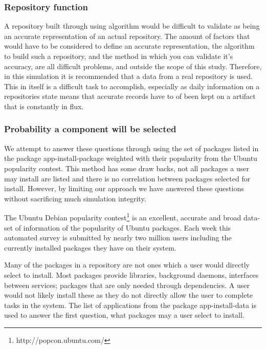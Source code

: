 \subsubsection{Repository function}

A repository built through using algorithm would be difficult to validate as being an accurate representation of an actual repository.
The amount of factors that would have to be considered to define an accurate representation, the algorithm to build such a repository,
and the method in which you can validate it's accuracy,
are all difficult problems, and outside the scope of this study. 
Therefore, in this simulation it is recommended that a data from a real repository is used.
This in itself is a difficult task to accomplish, especially as daily information on a repositories state means that accurate records have to of been kept on a artifact that is constantly in flux.

\subsubsection{Probability a component will be selected}
{}We attempt to answer these questions through using the set of packages listed in the package app-install-package
{}weighted with their popularity from the Ubuntu popularity contest.
{}This method has some draw backs, not all packages a user may install are listed and there is no correlation between packages selected for install.
{}However, by limiting our approach we have answered these questions without sacrificing much simulation integrity.

The Ubuntu Debian popularity contest\footnote{http://popcon.ubuntu.com/} is an excellent, accurate and broad data-set of information of the popularity of Ubuntu packages.
Each week this automated survey is submitted by nearly two million users including the currently installed packages they have on their system.


Many of the packages in a repository are not ones which a user would directly select to install.
Most packages provide libraries, background daemons, interfaces between services; packages that are only needed through dependencies.
A user would not likely install these as they do not directly allow the user to complete tasks in the system.
The list of applications from the package app-install-data is used to answer the first question, what packages may a user select to install.

